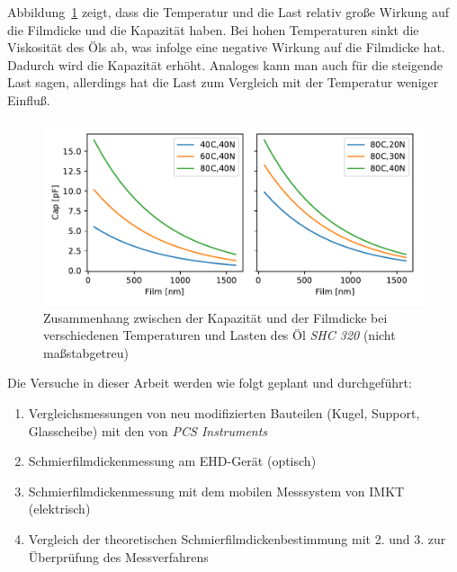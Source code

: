 Abbildung~\ref{fig:film_cap_with_dif_temp_and_load} zeigt, dass die Temperatur und die Last relativ große Wirkung auf die Filmdicke und die Kapazität haben.
Bei hohen Temperaturen sinkt die Viskosität des Öls ab, was infolge eine negative Wirkung auf die Filmdicke hat.
Dadurch wird die Kapazität erhöht.
Analoges kann man auch für die steigende Last sagen, allerdings hat die Last zum Vergleich mit der Temperatur weniger Einfluß.
\begin{figure}[htb]
    \centering
    \includegraphics[]{./images/film_cap_with_dif_temp_and_load_shc320.pdf}
    \caption{Zusammenhang zwischen der Kapazität und der Filmdicke bei verschiedenen Temperaturen und Lasten des Öl \textit{SHC 320} (nicht maßstabgetreu)}
    \label{fig:film_cap_with_dif_temp_and_load}
\end{figure}

Die Versuche in dieser Arbeit werden wie folgt geplant und durchgeführt:
\begin{enumerate}
    \item Vergleichsmessungen von neu modifizierten Bauteilen (Kugel, Support, Glasscheibe) mit den von \textit{PCS Instruments}
    \item Schmierfilmdickenmessung am EHD-Gerät (optisch)
    \item Schmierfilmdickenmessung mit dem mobilen Messsystem von IMKT (elektrisch)
    \item Vergleich der theoretischen Schmierfilmdickenbestimmung mit 2. und 3. zur Überprüfung des Messverfahrens
\end{enumerate}

